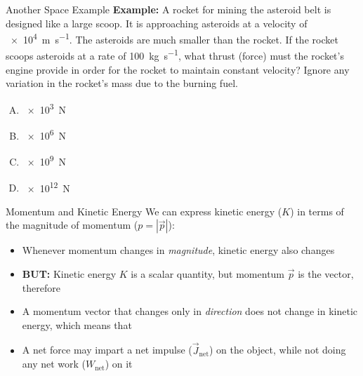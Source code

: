\documentclass[12pt,compress,aspectratio=169]{beamer}
\begin{document}
\begin{frame}{Another Space Example}
  \textbf{Example:} A rocket for mining the asteroid belt is designed like a
  large scoop. It is approaching asteroids at a velocity of
  \SI{e4}{\metre\per\second}. The asteroids are much smaller than the rocket.
  If the rocket scoops asteroids at a rate of \SI{100}{\kilo\gram\per\second},
  what thrust (force) must the rocket's engine provide in order for the rocket
  to maintain constant velocity? Ignore any variation in the rocket's mass due
  to the burning fuel.
  \begin{enumerate}[(A)]
  \item\SI{e3}\newton
  \item\SI{e6}\newton
  \item\SI{e9}\newton
  \item\SI{e12}\newton
  \end{enumerate}
\end{frame}




\begin{frame}{Momentum and Kinetic Energy}
  We can express kinetic energy ($K$) in terms of the magnitude of momentum
  ($p=|\vec p|$):
  
  \begin{itemize}
  \item Whenever momentum changes in \emph{magnitude}, kinetic energy also
    changes
  \item\textbf{BUT:} Kinetic energy $K$ is a scalar quantity, but momentum
    $\vec p$ is the vector, therefore
  \item A momentum vector that changes only in \emph{direction} does not
    change in kinetic energy, which means that
  \item A net force may impart a net impulse ($\vec J_\text{net}$) on the
    object, while not doing any net work ($W_\text{net}$) on it
  \end{itemize}
\end{frame}
\end{document}

